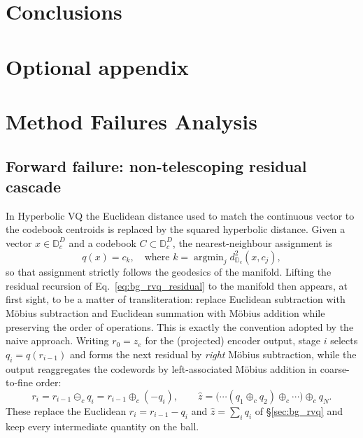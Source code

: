 \documentclass[12pt]{report}
\begin{document}
\chapter{Conclusions}


\appendix
\chapter{Optional appendix}
\chapter{Method Failures Analysis}
\section{Forward failure: non-telescoping residual cascade}
\label{sec:hrq}
In Hyperbolic VQ the Euclidean distance used to match the continuous vector to the codebook centroids is replaced by the squared hyperbolic distance. Given a vector $x \in \mathbb{D}_c^D$ and a codebook $C \subset \mathbb{D}_c^D$, the nearest-neighbour assignment is
\begin{equation}
    q(x) = c_k, \quad \text{where } k = \operatorname{argmin}_j d_{\mathbb{D}_c}^2(x, c_j),
\end{equation}
so that assignment strictly follows the geodesics of the manifold. Lifting the residual recursion of Eq.~\ref{eq:bg_rvq_residual} to the manifold then appears, at first sight, to be a matter of transliteration: replace Euclidean subtraction with M\"obius subtraction and Euclidean summation with M\"obius addition while preserving the order of operations. This is exactly the convention adopted by the naive approach. Writing $r_0 = z_e$ for the (projected) encoder output, stage $i$ selects $q_i = q(r_{i-1})$ and forms the next residual by \emph{right} M\"obius subtraction, while the output reaggregates the codewords by left-associated M\"obius addition in coarse-to-fine order:
\begin{equation}
    \label{eq:prev_residual}
    r_i = r_{i-1}\ominus_c q_i = r_{i-1}\oplus_c(-q_i),
    \qquad
    \hat z = \big(\cdots(q_1\oplus_c q_2)\oplus_c\cdots\big)\oplus_c q_{N} .
\end{equation}
These replace the Euclidean $r_i = r_{i-1}-q_i$ and $\hat z=\sum_i q_i$ of \S\ref{sec:bg_rvq} and keep every intermediate quantity on the ball.
\end{document}
